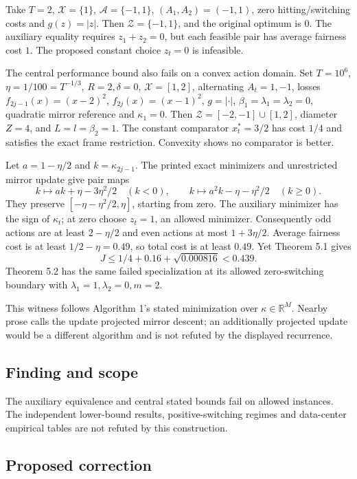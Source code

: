 \documentclass[11pt]{article}
\begin{document}
Take \(T=2\), \(\mathcal X=\{1\}\), \(\mathcal A=\{-1,1\}\), \((A_1,A_2)=(-1,1)\), zero hitting/switching costs and \(g(z)=|z|\). Then \(\mathcal Z=\{-1,1\}\), and the original optimum is \(0\). The auxiliary equality requires \(z_1+z_2=0\), but each feasible pair has average fairness cost \(1\). The proposed constant choice \(z_t=0\) is infeasible.

The central performance bound also fails on a convex action domain. Set \(T=10^6\), \(\eta=1/100=T^{-1/3}\), \(R=2,\delta=0\), \(\mathcal X=[1,2]\), alternating \(A_t=1,-1\), losses \(f_{2j-1}(x)=(x-2)^2\), \(f_{2j}(x)=(x-1)^2\), \(g=|\cdot|\), \(\beta_1=\lambda_1=\lambda_2=0\), quadratic mirror reference and \(\kappa_1=0\). Then \(\mathcal Z=[-2,-1]\cup[1,2]\), diameter \(Z=4\), and \(L=l=\beta_2=1\). The constant comparator \(x_t^*=3/2\) has cost \(1/4\) and satisfies the exact frame restriction. Convexity shows no comparator is better.

Let \(a=1-\eta/2\) and \(k=\kappa_{2j-1}\). The printed exact minimizers and unrestricted mirror update give pair maps \[k\mapsto ak+\eta-3\eta^2/2\quad(k<0),\qquad k\mapsto a^2k-\eta-\eta^2/2\quad(k\geq0).\] They preserve \([-\eta-\eta^2/2,\eta]\), starting from zero. The auxiliary minimizer has the sign of \(\kappa_t\); at zero choose \(z_t=1\), an allowed minimizer. Consequently odd actions are at least \(2-\eta/2\) and even actions at most \(1+3\eta/2\). Average fairness cost is at least \(1/2-\eta=0.49\), so total cost is at least \(0.49\). Yet Theorem 5.1 gives \[J\leq1/4+0.16+\sqrt{0.000816}<0.439.\] Theorem 5.2 has the same failed specialization at its allowed zero-switching boundary with \(\lambda_1=1,\lambda_2=0,m=2\).

This witness follows Algorithm 1’s stated minimization over \(\kappa\in\mathbb R^M\). Nearby prose calls the update projected mirror descent; an additionally projected update would be a different algorithm and is not refuted by the displayed recurrence.

\subsection*{Finding and scope}

The auxiliary equivalence and central stated bounds fail on allowed instances. The independent lower-bound results, positive-switching regimes and data-center empirical tables are not refuted by this construction.

\subsection*{Proposed correction}
\end{document}
